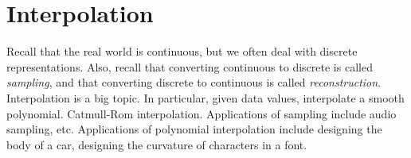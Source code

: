 \documentclass[letterpaper,12pt]{article}
\begin{document}
\section*{Interpolation}
Recall that the real world is continuous, but we often deal with discrete representations. Also, recall that converting continuous to discrete is called \textit{sampling}, and that converting discrete to continuous is called \textit{reconstruction}. Interpolation is a big topic. In particular, given data values, interpolate a smooth polynomial. Catmull-Rom interpolation. Applications of sampling include audio sampling, etc. Applications of polynomial interpolation include designing the body of a car, designing the curvature of characters in a font.
\end{document}
